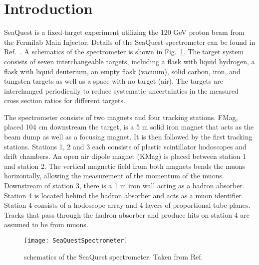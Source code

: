 \section{Introduction}
SeaQuest is a fixed-target experiment utilizing the 120 GeV proton beam from 
the Fermilab Main Injector. Details of the SeaQuest spectrometer can be found 
in Ref.\ \cite{aidala2019}. A schematics of the spectrometer is shown in Fig.\ 
\ref{fig:spectrometer}. The target system consists of seven interchangeable 
targets, including a flask with liquid hydrogen, a flask with liquid deuterium,
an empty flask (vacuum), solid carbon, iron, and tungsten targets as well as a 
space with no target (air). The targets are interchanged periodically to reduce 
systematic uncertainties in the measured cross section ratios for different 
targets.

The spectrometer consists of two magnets and four tracking stations. FMag, 
placed 104 cm downstream the target, is a 5 m solid iron magnet that acts as 
the beam dump as well as a focusing magnet. It is then followed by the first 
tracking stations. Stations 1, 2 and 3 each consists of plastic scintillator 
hodoscopes and drift chambers. An open air dipole magnet (KMag) is placed 
between station 1 and station 2. The vertical magnetic field from both magnets 
bends the muons horizontally, allowing the measurement of the momentum of the 
muons. Downstream of station 3, there is a 1 m iron wall acting as a hadron 
absorber. Station 4 is located behind the hadron absorber and acts as a muon 
identifier. Station 4 consists of a hodoscope array and 4 layers of 
proportional tube planes. Tracks that pass through the hadron absorber and 
produce hits on station 4 are assumed to be from muons. 

\begin{figure}[h!]
    \centering
    \texttt{[image: SeaQuestSpectrometer]}
    \caption{schematics of the SeaQuest spectrometer. Taken from Ref.\ 
		\cite{aidala2019}}
    \label{fig:spectrometer}
\end{figure}
\

